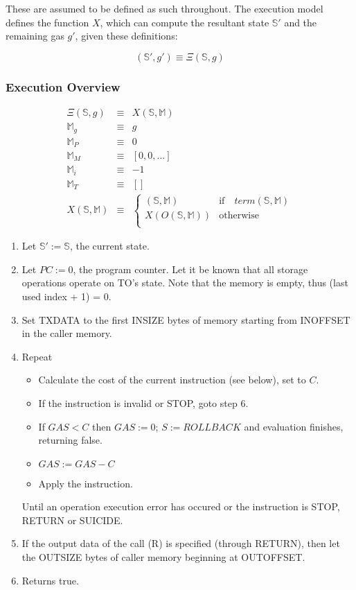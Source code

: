 \documentclass[9pt,oneside]{amsart}
\begin{document}
\begin{multicols}{2}
These are assumed to be defined as such throughout. The execution model defines the function $X$, which can compute the resultant state $\mathbb{S}'$ and the remaining gas $g'$, given these definitions:

\begin{equation}
(\mathbb{S}', g') \equiv \Xi(\mathbb{S}, g)
\end{equation}

\subsubsection{Execution Overview}



\begin{eqnarray}
\Xi(\mathbb{S}, g) & \equiv & X(\mathbb{S}, \mathbb{M}) \\
\mathbb{M}_g & \equiv & g \\
\mathbb{M}_P & \equiv & 0 \\
\mathbb{M}_M & \equiv & [0, 0,...] \\
\mathbb{M}_i & \equiv & -1 \\
\mathbb{M}_T & \equiv & [] \\
X(\mathbb{S}, \mathbb{M}) & \equiv & \begin{cases}
(\mathbb{S}, \mathbb{M}) & \text{if} \quad term(\mathbb{S}, \mathbb{M})\\
X(O(\mathbb{S}, \mathbb{M})) & \text{otherwise}\\
\end{cases}
\end{eqnarray}



\begin{enumerate}
\item Let $\mathbb{S}' := \mathbb{S}$, the current state.
\item Let $PC := 0$, the program counter.
Let it be known that all storage operations operate on TO's state.
Note that the memory is empty, thus (last used index + 1) = 0.
\item Set TXDATA to the first INSIZE bytes of memory starting from INOFFSET in the caller memory.
\item Repeat
\begin{itemize}
\item Calculate the cost of the current instruction (see below), set to $C$.
\item If the instruction is invalid or STOP, goto step 6.
\item If $GAS < C$ then $GAS := 0$; $S := ROLLBACK$ and evaluation finishes, returning false. 
\item $GAS := GAS - C$
\item Apply the instruction.
\end{itemize}
Until an operation execution error has occured or the instruction is STOP, RETURN or SUICIDE.
\item If the output data of the call (R) is specified (through RETURN), then let the OUTSIZE bytes of caller memory beginning at OUTOFFSET.
\item Returns true.
\end{enumerate}




\end{multicols}
\end{document}
